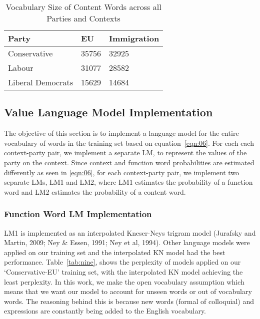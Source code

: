 \begin{table}%
\caption{Vocabulary Size of Content Words across all Parties and Contexts}
\label{tab:eight}
\begin{minipage}{\columnwidth}
\begin{center}
\begin{tabular}{lll} 
\toprule
Party &	EU & Immigration \\
  \toprule
  

Conservative	& 35756	& 32925 \\
Labour	& 31077	& 28582 \\
Liberal Democrats	& 15629	& 14684 \\
\bottomrule
\end{tabular}
\end{center}
\bigskip\centering

\end{minipage}
\end{table}%


\subsection{Value Language Model Implementation}
The objective of this section is to implement a language model for the entire vocabulary of words in the training set based on equation~\ref{eqn:06}. For each each context-party pair, we implement a separate LM, to represent the values of the party on the context. Since context and function word probabilities are estimated differently as seen in \ref{eqn:06}, for each context-party pair, we implement two separate LMs, LM1 and LM2, where LM1 estimates the probability of a function word and LM2 estimates the probability of a content word.

\subsubsection{Function Word LM Implementation}
LM1 is implemented as an interpolated Kneser-Neys trigram model (Jurafsky and Martin, 2009; Ney & Essen, 1991; Ney et al, 1994). Other language models were applied on our training set and the interpolated KN model had the best performance. Table~\ref{tab:nine}, shows the perplexity of models applied on our `Conservative-EU' training set, with the interpolated KN model achieving the least perplexity. In this work, we make the open vocabulary assumption which means that we want our model to account for unseen words or out of vocabulary words. The reasoning behind this is because new words (formal of colloquial) and expressions are constantly being added to the English vocabulary.

